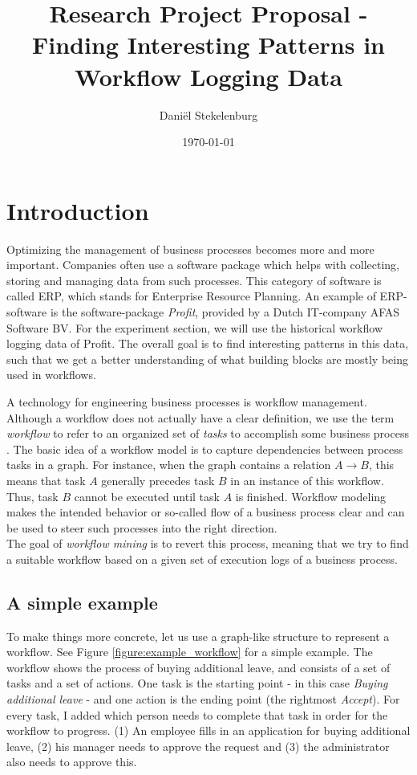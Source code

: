 \documentclass[a4paper,11pt]{article}
\begin{document}
\title{Research Project Proposal - Finding Interesting Patterns in Workflow Logging Data}
\date{\today}
\author{
        Dani\"el Stekelenburg		
}
 
\maketitle

\abstract{}

\section{Introduction}
Optimizing the management of business processes becomes more and more important. Companies often use a software package which helps with collecting, storing and managing data from such processes. This category of software is called ERP, which stands for Enterprise Resource Planning. An example of ERP-software is the software-package \textit{Profit}, provided by a Dutch IT-company AFAS Software BV. For the experiment section, we will use the historical workflow logging data of Profit. The overall goal is to find interesting patterns in this data, such that we get a better understanding of what building blocks are mostly being used in workflows.

A technology for engineering business processes is workflow management. Although a workflow does not actually have a clear definition, we use the term \textit{workflow} to refer to an organized set of \textit{tasks} to accomplish some business process \cite{Georgakopoulos1995}. The basic idea of a workflow model is to capture dependencies between process tasks in a graph. For instance, when the graph contains a relation $A \rightarrow B$, this means that task $A$ generally precedes task $B$ in an instance of this workflow. Thus, task $B$ cannot be executed until task $A$ is finished. Workflow modeling makes the intended behavior or so-called flow of a business process clear and can be used to steer such processes into the right direction.\\
The goal of \textit{workflow mining} is to revert this process, meaning that we try to find a suitable workflow based on a given set of execution logs of a business process.

\subsection{A simple example}
To make things more concrete, let us use a graph-like structure to represent a workflow. See Figure \ref{figure:example_workflow} for a simple example. The workflow shows the process of buying additional leave, and consists of a set of tasks and a set of actions. One task is the starting point - in this case \textit{Buying additional leave} - and one action is the ending point (the rightmost \textit{Accept}). For every task, I added which person needs to complete that task in order for the workflow to progress. (1) An employee fills in an application for buying additional leave, (2) his manager needs to approve the request and (3) the administrator also needs to approve this. 
\end{document}
